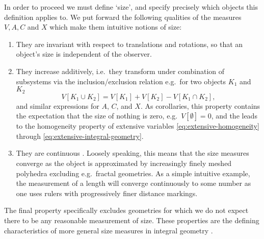In order to proceed we must define `size', and specify precisely which objects this definition applies to.
We put forward the following qualities of the measures $V, A, C$ and $X$ which make them intuitive notions of size:
\begin{enumerate}
\item They are invariant with respect to translations and rotations, so that an object's size is independent of the observer.
\item They increase additively, i.e.\ they transform under combination of subsystems via the inclusion/exclusion relation e.g.\ for two objects $K_1$ and $K_2$
  \begin{equation}\label{eq:additivity}
    V[K_1 \cup K_2] = V[K_1] + V[K_2] - V[K_1 \cap K_2],
  \end{equation}
  and similar expressions for $A$, $C$, and $X$.
  As corollaries, this property contains the expectation that the size of nothing is zero, e.g.\ $V[\emptyset] = 0$, and the leads to the homogeneity property of extensive variables \eqref{eq:extensive-homogeneity} through \eqref{eq:extensive-integral-geometry}.
\item They are continuous%
  .
  Loosely speaking, this means that the size measures converge as the object is approximated by increasingly finely meshed polyhedra excluding e.g.\ fractal geometries.
  As a simple intuitive example, the measurement of a length will converge continuously to some number as one uses rulers with progressively finer distance markings.
\end{enumerate}
The final property specifically excludes geometries for which we do not expect there to be any reasonable measurement of size.
These properties are the defining characteristics of more general size measures in integral geometry \cite{Santalo2004, Klain1997}.



